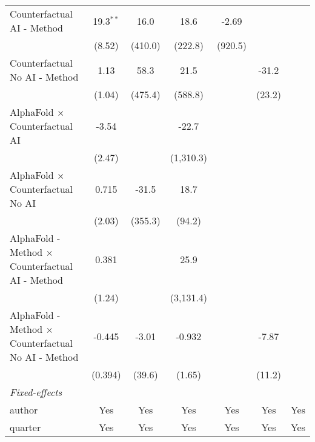 \begin{tabular}{lcccccc}
   Counterfactual AI - Method                                 & 19.3$^{**}$ & 16.0          & 18.6       & -2.69     &               &   \\   
                                                              & (8.52)      & (410.0)       & (222.8)    & (920.5)   &               &   \\   
   Counterfactual No AI - Method                              & 1.13        & 58.3          & 21.5       &           & -31.2         &   \\   
                                                              & (1.04)      & (475.4)       & (588.8)    &           & (23.2)        &   \\   
   AlphaFold $\times$ Counterfactual AI                       & -3.54       &               & -22.7      &           &               &   \\   
                                                              & (2.47)      &               & (1,310.3)  &           &               &   \\   
   AlphaFold $\times$ Counterfactual No AI                    & 0.715       & -31.5         & 18.7       &           &               &   \\   
                                                              & (2.03)      & (355.3)       & (94.2)     &           &               &   \\   
   AlphaFold - Method $\times$ Counterfactual AI - Method     & 0.381       &               & 25.9       &           &               &   \\   
                                                              & (1.24)      &               & (3,131.4)  &           &               &   \\   
   AlphaFold - Method $\times$ Counterfactual No AI - Method  & -0.445      & -3.01         & -0.932     &           & -7.87         &   \\   
                                                              & (0.394)     & (39.6)        & (1.65)     &           & (11.2)        &   \\   
   \midrule
   \emph{Fixed-effects}\\
   author                                                     & Yes         & Yes           & Yes        & Yes       & Yes           & Yes\\  
   quarter                                                    & Yes         & Yes           & Yes        & Yes       & Yes           & Yes\\  

\end{tabular}
